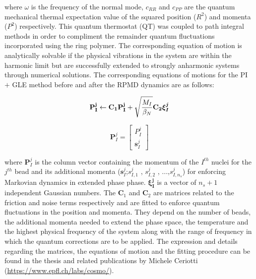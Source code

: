\noindent where $\omega$ is the frequency of the normal mode, $c_{RR}$ and $c_{PP}$ are the quantum mechanical thermal expectation value of the squared position ($R^2$) and momenta ($P^2$) respectively. This quantum thermostat (QT) was coupled to path integral methods\cite{ceriotti2011accelerating} in order to compliment the remainder quantum fluctuations incorporated using the ring polymer. The corresponding equation of motion is analytically solvable if the physical vibrations in the system are within the harmonic limit but are successfully extended to strongly anharmonic systems\cite{ceriotti2011accelerating} through numerical solutions. The corresponding equations of motions for the PI $+$ GLE method before and after the RPMD dynamics are as follows: 

\begin{equation}
\mathbf{P_{I}^{j}} \leftarrow \mathbf{C_1} \mathbf{P_{I}^{j}} + \sqrt{\frac{M_I}{\beta_{N}}} \mathbf{C_{2}} \boldsymbol{\xi_{I}^{j}} \notag
\end{equation}


\begin{equation}
    \textbf{P}_I^{j} = 
    \begin{bmatrix}
        P_I^{j} \\ \textbf{s}_I^{j}
    \end{bmatrix} \label{QNMD-95}
\end{equation}

\noindent where $\textbf{P}_I^{j}$ is the column vector containing the momentum of the $I^{th}$ nuclei for the $j^{th}$ bead and its additional momenta ($\textbf{s}_I^{j}$;\quad $s_{I,1}^j$ , $s_{I,2}^j$ , ...,$s_{I,n_s}^j$) for enforcing Markovian dynamics in extended phase phase. $\boldsymbol{\xi_{I}^{j}}$ is a vector of $n_s + 1$ independent Gaussian numbers. The $\textbf{C}_1$ and $\textbf{C}_2$ are matrices related to the friction and noise terms respectively and are fitted to enforce quantum fluctuations in the position and momenta. They depend on the number of beads, the additional momenta needed to extend the phase space, the temperature and the highest physical frequency of the system along with the range of frequency in which the quantum corrections are to be applied. The expression and details regarding the matrices, the equations of motion and the fitting procedure can be found in the thesis\cite{ceriotti2010novel} and related publications\cite{ceriotti2012efficient,ceriotti2011accelerating} by Michele Ceriotti (\underline{https://www.epfl.ch/labs/cosmo/}).


